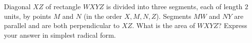 Diagonal $XZ$ of rectangle $WXYZ$ is divided into three segments, each of length $2$ units, by points $M$ and $N$ (in the order $X,M,N,Z$). Segments $MW$ and $NY$ are parallel and are both perpendicular to $XZ$. What is the area of $WXYZ$? Express your answer in simplest radical form.
